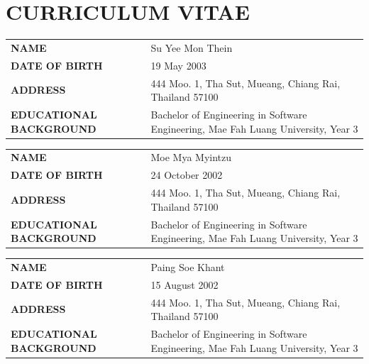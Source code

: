 \documentclass[12pt,a4paper]{report}
\begin{document}
\clearpage\chapter*{CURRICULUM VITAE}
\begin{table}[H]\centering\begin{tabularx}{\textwidth}{>{\bfseries}p{}X}\toprule NAME&Su Yee Mon Thein\\DATE OF BIRTH&19 May 2003\\ADDRESS&444 Moo. 1, Tha Sut, Mueang, Chiang Rai, Thailand 57100\\EDUCATIONAL BACKGROUND&Bachelor of Engineering in Software Engineering, Mae Fah Luang University, Year 3\\\bottomrule\end{tabularx}\end{table}
\begin{table}[H]\centering\begin{tabularx}{\textwidth}{>{\bfseries}p{}X}\toprule NAME&Moe Mya Myintzu\\DATE OF BIRTH&24 October 2002\\ADDRESS&444 Moo. 1, Tha Sut, Mueang, Chiang Rai, Thailand 57100\\EDUCATIONAL BACKGROUND&Bachelor of Engineering in Software Engineering, Mae Fah Luang University, Year 3\\\bottomrule\end{tabularx}\end{table}
\begin{table}[H]\centering\begin{tabularx}{\textwidth}{>{\bfseries}p{}X}\toprule NAME&Paing Soe Khant\\DATE OF BIRTH&15 August 2002\\ADDRESS&444 Moo. 1, Tha Sut, Mueang, Chiang Rai, Thailand 57100\\EDUCATIONAL BACKGROUND&Bachelor of Engineering in Software Engineering, Mae Fah Luang University, Year 3\\\bottomrule\end{tabularx}\end{table}
\end{document}
